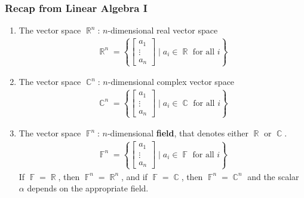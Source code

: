 \documentclass[10pt]{article}
\DeclareMathOperator{\R}{{\mathbb{R}}}
\DeclareMathOperator{\C}{{\mathbb{C}}}
\DeclareMathOperator{\F}{{\mathbb{F}}}
\theoremstyle{break}
\begin{document}
\subsubsection{Recap from Linear Algebra I}
\begin{enumerate}
    \item The vector space $\R^n$: $n$-dimensional real vector space
        \begin{align*}
            \R^n = \left\{\begin{bmatrix} a_1 \\ \vdots \\ a_n\end{bmatrix} \mid a_i \in \R \text{ for all }i\right\}
        \end{align*}
    \item The vector space $\C^n$: $n$-dimensional complex vector space
        \begin{align*}
            \C^n = \left\{\begin{bmatrix} a_1 \\ \vdots \\ a_n\end{bmatrix} \mid a_i \in \C \text{ for all }i\right\}
        \end{align*}
    \item The vector space $\F^n$: $n$-dimensional \textbf{field}, that denotes either $\R$ or $\C$.
        \begin{align*}
            \F^n = \left\{\begin{bmatrix} a_1 \\ \vdots \\ a_n\end{bmatrix} \mid a_i \in \F \text{ for all }i\right\}
        \end{align*}
        If $\F = \R$, then $\F^n = \R^n$, and if $\F = \C$, then $\F^n = \C^n$ and the scalar $\alpha$ depends on the appropriate field.
\end{enumerate}
\end{document}
